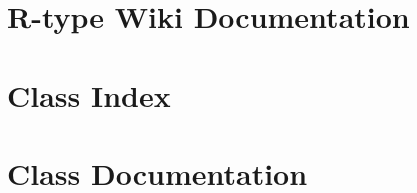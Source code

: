 \let\mypdfximage\pdfximage\def\pdfximage{\immediate\mypdfximage}\documentclass[twoside]{book}
\newcommand{\+}{\discretionary{\mbox{\scriptsize$\hookleftarrow$}}{}{}}
\newcommand{\clearemptydoublepage}{%
  \newpage{\pagestyle{empty}\cleardoublepage}%
}
\begin{document}
\chapter{R-\/type Wiki Documentation}
\label{md_wiki}

\chapter{Class Index}

\chapter{Class Documentation}





























\backmatter
\newpage
{}
\clearemptydoublepage
{}
\printindex
\end{document}
